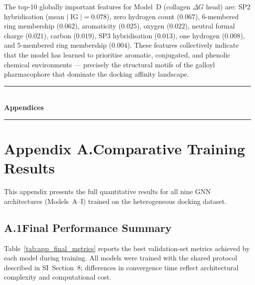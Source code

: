 \documentclass[11pt]{article}
\begin{document}
\noindent
The top-10 globally important features for Model~D (collagen $\Delta G$
head) are: SP2 hybridisation (mean $|\operatorname{IG}| = 0.078$),
zero hydrogen count ($0.067$), 6-membered ring membership ($0.062$),
aromaticity ($0.025$), oxygen ($0.022$), neutral formal charge ($0.021$),
carbon ($0.019$), SP3 hybridisation ($0.013$),
one hydrogen ($0.008$), and 5-membered ring membership ($0.004$).
These features collectively indicate that the model has learned to
prioritise aromatic, conjugated, and phenolic chemical environments ---
precisely the structural motifs of the galloyl pharmacophore that
dominate the docking affinity landscape.

\label{si:interpret_end}


\clearpage
\begin{center}
\rule{\textwidth}{1pt}\\[6pt]
{\LARGE\bfseries Appendices}\\[4pt]
\rule{\textwidth}{1pt}
\end{center}
\vspace{10pt}

\section*{Appendix A.\quad Comparative Training Results}
\label{app:results}

This appendix presents the full quantitative results for all nine GNN
architectures (Models~A--I) trained on the heterogeneous docking dataset.

\subsection*{A.1\quad Final Performance Summary}

Table~\ref{tab:app_final_metrics} reports the best validation-set metrics
achieved by each model during training.
All models were trained with the shared protocol described in
SI~Section~8; differences in convergence time reflect architectural
complexity and computational cost.
\end{document}
